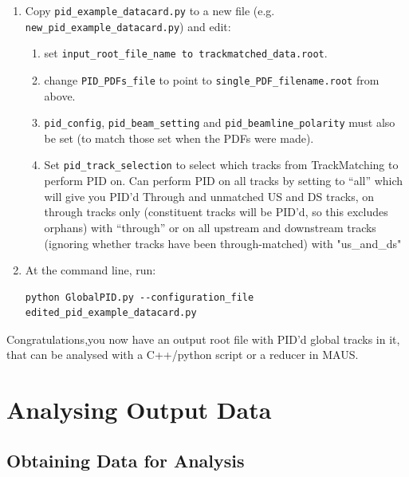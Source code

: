 \documentclass[a4paper,10pt]{article}
\begin{document}
\begin{enumerate}[resume]
\item{Copy \texttt{pid\_example\_datacard.py} to a new file (e.g. \texttt{new\_pid\_example\_datacard.py}) and edit:}
\begin{enumerate}[label=(\alph*)]
\item{set \texttt{input\_root\_file\_name to trackmatched\_data.root}.}
\item{change \texttt{PID\_PDFs\_file} to point to \texttt{single\_PDF\_filename.root} from above.}
\item{\texttt{pid\_config}, \texttt{pid\_beam\_setting} and \texttt{pid\_beamline\_polarity} must also be set (to match those set when the PDFs were made).}
\item{Set \texttt{pid\_track\_selection} to select which tracks from TrackMatching to perform PID on. Can perform PID on all tracks by setting to ``all'' which will give you PID'd Through and unmatched US and DS tracks, on through tracks only (constituent tracks will be PID'd, so this excludes orphans) with ``through'' or on all upstream and downstream tracks (ignoring whether tracks have been through-matched) with "us\_and\_ds"}
\end{enumerate}

\item At the command line, run:
\begin{lstlisting}
python GlobalPID.py --configuration_file edited_pid_example_datacard.py
\end{lstlisting}
\end{enumerate}

Congratulations,you now have an output root file with PID'd global tracks in it, that can be analysed with a C++/python script or a reducer in MAUS.

\section{Analysing Output Data}
\label{sec:Analysis}

  \subsection{Obtaining Data for Analysis}
\end{document}
